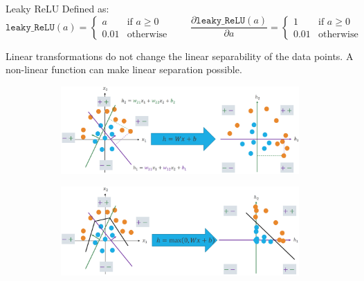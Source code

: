 \begin{description}
\begin{descriptionlist}
            \item[Leaky ReLU] 
                Defined as:
                \[ 
                    \texttt{leaky\_ReLU}(a) = \begin{cases}
                        a & \text{if $a \geq 0$} \\
                        0.01 & \text{otherwise}
                    \end{cases} \hspace{2em}
                    \frac{\partial \texttt{leaky\_ReLU}(a)}{\partial a} = \begin{cases}
                        1 & \text{if } a \geq 0 \\
                        0.01 & \text{otherwise}
                    \end{cases}
                \]
        \end{descriptionlist}

        \begin{example}
            Linear transformations do not change the linear separability of the data points.
            A non-linear function can make linear separation possible.

            \begin{figure}[H]
                \centering
                \begin{subfigure}{0.55\linewidth}
                    \centering
                    \includegraphics[width=\linewidth]{./img/relu_separability_1.png}
                \end{subfigure}

                \begin{subfigure}{0.55\linewidth}
                    \centering
                    \includegraphics[width=\linewidth]{./img/relu_separability_2.png}
                \end{subfigure}
            \end{figure}
        \end{example}
    

\end{description}
